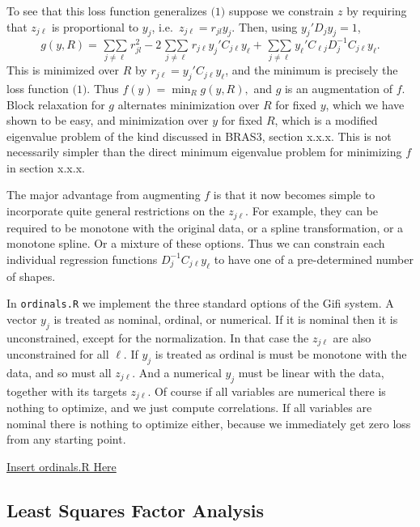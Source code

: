 \documentclass[
  12pt,
]{book}
\begin{document}
To see that this loss function generalizes \(\text{(1)}\) suppose we constrain \(z\) by requiring that \(z_{j\ell}\) is proportional to \(y_j\), i.e.~\(z_{j\ell}=r_{jl}y_j.\)
Then, using \(y_j'D_jy_j=1\),
\[
g(y,R)=\mathop{\sum\sum}\limits_{j\not=\ell} r_{jl}^2-2\mathop{\sum\sum}\limits_{j\not=\ell} r_{j\ell}y_j'C_{j\ell}y_\ell+\mathop{\sum\sum}\limits_{j\not=\ell} y_\ell'C_{\ell j}D_j^{-1}C_{j\ell}y_\ell.
\]
This is minimized over \(R\) by \(r_{j\ell}=y_j'C_{j\ell}y_\ell\), and the minimum is precisely the loss function \(\text{(1)}\). Thus \(f(y)=\min_R g(y,R),\) and \(g\) is an augmentation of \(f\).
Block relaxation for \(g\) alternates minimization over \(R\) for fixed \(y\), which we have shown to be easy, and minimization over \(y\) for fixed \(R\), which is a modified eigenvalue problem of the kind discussed in BRAS3, section x.x.x. This is not necessarily simpler than the direct minimum eigenvalue problem for minimizing \(f\) in section x.x.x.

The major advantage from augmenting \(f\) is that it now becomes simple to incorporate quite general restrictions on the \(z_{j\ell}.\) For example, they can be required to be monotone with the original data, or a spline transformation, or a monotone spline. Or a mixture of these options. Thus we can constrain each individual regression
functions \(D_j^{-1}C_{j\ell}y_\ell\) to have one of a pre-determined number of shapes.

In \texttt{ordinals.R} we implement the three standard options of the Gifi system. A vector \(y_j\) is treated as nominal, ordinal, or numerical.
If it is nominal then it is unconstrained, except for the normalization.
In that case the \(z_{j\ell}\) are also unconstrained for all \(\ell\).
If \(y_j\) is treated as ordinal is must be monotone with the data, and so must all \(z_{j\ell}\). And a numerical \(y_j\) must be linear with the data, together with its targets \(z_{j\ell}\). Of course if all variables are numerical there is nothing to optimize, and we just compute correlations. If all variables are nominal there is nothing to optimize either, because we immediately get zero loss from any starting point.

\href{../code/ordinals.R}{Insert ordinals.R Here}

\hypertarget{least-squares-factor-analysis}{%
\subsection{Least Squares Factor Analysis}\label{least-squares-factor-analysis}}
\end{document}
